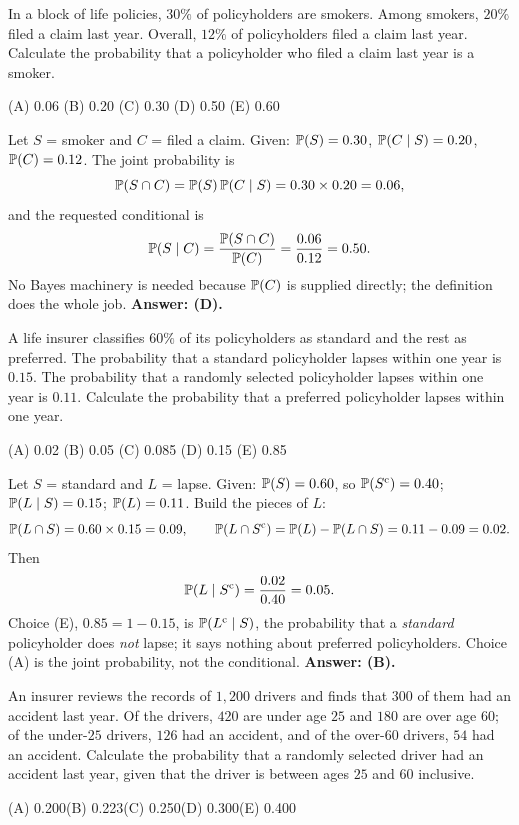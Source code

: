 \begin{example}
In a block of life policies, $30\%$ of policyholders are smokers. Among
smokers, $20\%$ filed a claim last year. Overall, $12\%$ of policyholders filed
a claim last year. Calculate the probability that a policyholder who filed a
claim last year is a smoker.

\medskip
(A) 0.06 \quad (B) 0.20 \quad (C) 0.30 \quad (D) 0.50 \quad (E) 0.60
\end{example}

\begin{solution}
Let $S$ = smoker and $C$ = filed a claim. Given: $\mathbb{P}(S) = 0.30$,
$\mathbb{P}(C \mid S) = 0.20$, $\mathbb{P}(C) = 0.12$. The joint probability is
\[
\mathbb{P}(S \cap C) = \mathbb{P}(S)\,\mathbb{P}(C \mid S) = 0.30 \times 0.20 = 0.06 ,
\]
and the requested conditional is
\[
\mathbb{P}(S \mid C) = \frac{\mathbb{P}(S \cap C)}{\mathbb{P}(C)} = \frac{0.06}{0.12} = 0.50 .
\]
No Bayes machinery is needed because $\mathbb{P}(C)$ is supplied directly; the
definition does the whole job.
\textbf{Answer: (D).}
\end{solution}

\begin{example}
A life insurer classifies $60\%$ of its policyholders as standard and the rest
as preferred. The probability that a standard policyholder lapses within one
year is $0.15$. The probability that a randomly selected policyholder lapses
within one year is $0.11$. Calculate the probability that a preferred
policyholder lapses within one year.

\medskip
(A) 0.02 \quad (B) 0.05 \quad (C) 0.085 \quad (D) 0.15 \quad (E) 0.85
\end{example}

\begin{solution}
Let $S$ = standard and $L$ = lapse. Given: $\mathbb{P}(S) = 0.60$, so
$\mathbb{P}(S^{\mathrm{c}}) = 0.40$; $\mathbb{P}(L \mid S) = 0.15$; $\mathbb{P}(L) = 0.11$.
Build the pieces of $L$:
\[
\mathbb{P}(L \cap S) = 0.60 \times 0.15 = 0.09, \qquad
\mathbb{P}(L \cap S^{\mathrm{c}}) = \mathbb{P}(L) - \mathbb{P}(L \cap S) = 0.11 - 0.09 = 0.02 .
\]
Then
\[
\mathbb{P}(L \mid S^{\mathrm{c}}) = \frac{0.02}{0.40} = 0.05 .
\]
Choice (E), $0.85 = 1 - 0.15$, is $\mathbb{P}(L^{\mathrm{c}} \mid S)$, the probability that
a \emph{standard} policyholder does \emph{not} lapse; it says nothing about
preferred policyholders. Choice (A) is the joint probability, not the
conditional.
\textbf{Answer: (B).}
\end{solution}

\begin{example}
An insurer reviews the records of $1{,}200$ drivers and finds that $300$ of
them had an accident last year. Of the drivers, $420$ are under age $25$ and
$180$ are over age $60$; of the under-$25$ drivers, $126$ had an accident, and
of the over-$60$ drivers, $54$ had an accident. Calculate the probability that
a randomly selected driver had an accident last year, given that the driver is
between ages $25$ and $60$ inclusive.

\medskip
(A) 0.200\qquad (B) 0.223\qquad (C) 0.250\qquad (D) 0.300\qquad (E) 0.400
\end{example}

